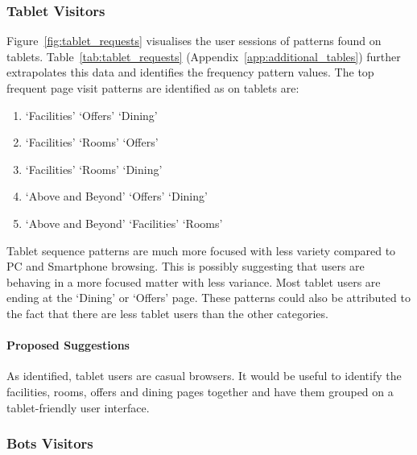 
\subsubsection{Tablet Visitors}
\label{sec:results:platform:tablet}

Figure~\ref{fig:tablet_requests} visualises the user sessions of patterns found on tablets. Table~\ref{tab:tablet_requests}  (Appendix~\ref{app:additional_tables}) further extrapolates this data and identifies the frequency pattern values. The top frequent page visit patterns are identified as on tablets are:

\begin{enumerate}
  \item `Facilities' \ra{} `Offers' \ra{} `Dining'
  \item `Facilities' \ra{} `Rooms' \ra{} `Offers'
  \item `Facilities' \ra{} `Rooms' \ra{} `Dining'
  \item `Above and Beyond' \ra{} `Offers' \ra{} `Dining'
  \item `Above and Beyond' \ra{} `Facilities' \ra{} `Rooms'
\end{enumerate}

Tablet sequence patterns are much more focused with less variety compared to PC and Smartphone browsing. This is possibly suggesting that users are behaving in a more focused matter with less variance. Most tablet users are ending at the `Dining' or `Offers' page. These patterns could also be attributed to the fact that there are less tablet users than the other categories.

\paragraph{Proposed Suggestions} As identified, tablet users are casual browsers. It would be useful to identify the facilities, rooms, offers and dining pages together and have them grouped on a tablet-friendly user interface. 



\subsubsection{Bots Visitors}
\label{sec:results:platform:bots}

